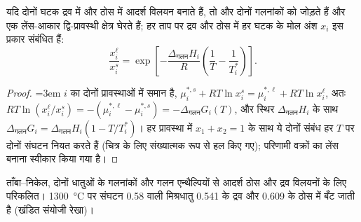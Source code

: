 \begin{proposition}[लेंस]\label{prop:b2:solid-liquid-diagrams:lens}
यदि दोनों घटक द्रव में और ठोस में आदर्श विलयन बनाते हैं, तो
 और  दोनों गलनांकों को जोड़ते हैं और एक
लेंस-आकार द्वि-प्रावस्थी क्षेत्र घेरते हैं; हर ताप पर द्रव और ठोस में हर
घटक के मोल अंश $x_i$ इस प्रकार संबंधित हैं:
\[
  \frac{x_i^{\ell}}{x_i^{s}} = \exp\left[-\frac{\Delta_{\text{गलन}}H_i}{R}\left(\frac1T - \frac1{T_i^*}\right)\right] .
\]
\end{proposition}

\begin{proof}\emergencystretch=3em
$i$ का  दोनों प्रावस्थाओं में समान है, $\mu_i^{*,s} +
RT\ln x_i^s = \mu_i^{*,\ell} + RT\ln x_i^\ell$, अतः $RT\ln(x_i^\ell/x_i^s) =
-(\mu_i^{*,\ell} - \mu_i^{*,s}) = -\Delta_{\text{गलन}}G_i(T)$, और स्थिर
$\Delta_{\text{गलन}}H_i$ के साथ $\Delta_{\text{गलन}}G_i = \Delta_{\text{गलन}}H_i(1 - T/T_i^*)$।
हर प्रावस्था में $x_1 + x_2 = 1$ के साथ ये दोनों संबंध हर $T$ पर दोनों
संघटन नियत करते हैं (चित्र के लिए संख्यात्मक रूप से हल किए गए); परिणामी
वक्रों का लेंस बनाना स्वीकार किया गया है।
\end{proof}

\begin{omfigure}

{\small ताँबा--निकेल, दोनों धातुओं के गलनांकों और गलन एन्थैल्पियों से आदर्श ठोस
और द्रव विलयनों के लिए परिकलित।
\qty{1300}{\degreeCelsius} पर संघटन 0.58 वाली मिश्रधातु 0.541 के द्रव
और 0.609 के ठोस में बँट जाती है (खंडित संयोजी रेखा)।}
\end{omfigure}


